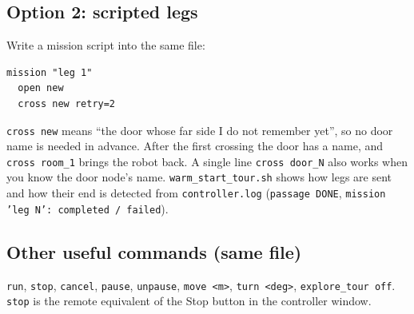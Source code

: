 \documentclass[11pt,a4paper]{article}
\newcommand{\f}[1]{\texttt{#1}}
\begin{document}
\subsection*{Option 2: scripted legs}
Write a mission script into the same file:
\begin{lstlisting}
mission "leg 1"
  open new
  cross new retry=2
\end{lstlisting}
\f{cross new} means ``the door whose far side I do not remember yet'', so no door name is needed in advance. After the
first crossing the door has a name, and \f{cross room\_\allowbreak{}1} brings the robot back. A single line \f{cross door\_\allowbreak{}N} also
works when you know the door node's name. \f{warm\_\allowbreak{}start\_\allowbreak{}tour.sh} shows how legs are sent and how their end is
detected from \f{controller.log} (\f{passage DONE}, \f{mission 'leg N': completed /\allowbreak{} failed}).

\subsection*{Other useful commands (same file)}
\f{run}, \f{stop}, \f{cancel}, \f{pause}, \f{unpause}, \f{move <m>}, \f{turn <deg>}, \f{explore\_\allowbreak{}tour off}.
\f{stop} is the remote equivalent of the Stop button in the controller window.
\end{document}
